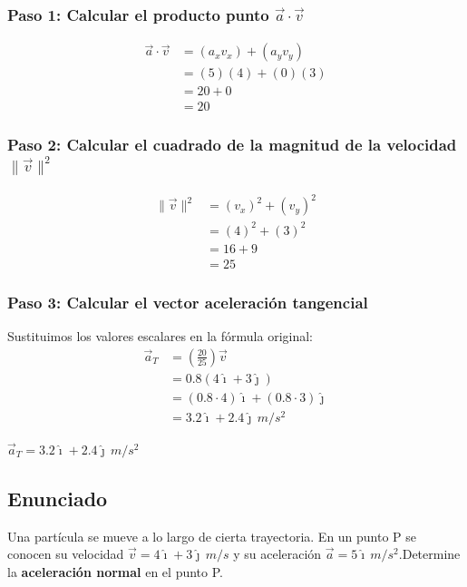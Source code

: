 \documentclass[12pt, a4paper]{article}
\begin{document}
\subsubsection*{Paso 1: Calcular el producto punto $\vec{a} \cdot \vec{v}$}
\begin{align*}
\vec{a} \cdot \vec{v} &= (a_x v_x) + (a_y v_y) \\
&= (5)(4) + (0)(3) \\
&= 20 + 0 \\
&= 20
\end{align*}

\subsubsection*{Paso 2: Calcular el cuadrado de la magnitud de la velocidad $\|\vec{v}\|^2$}
\begin{align*}
\|\vec{v}\|^2 &= (v_x)^2 + (v_y)^2 \\
&= (4)^2 + (3)^2 \\
&= 16 + 9 \\
&= 25
\end{align*}

\subsubsection*{Paso 3: Calcular el vector aceleración tangencial}
Sustituimos los valores escalares en la fórmula original:
\begin{align*}
\vec{a}_T &= \left( \frac{20}{25} \right) \vec{v} \\
&= 0.8 (4\hat{\imath} + 3\hat{\jmath}) \\
&= (0.8 \cdot 4)\hat{\imath} + (0.8 \cdot 3)\hat{\jmath} \\
&= 3.2\hat{\imath} + 2.4\hat{\jmath} \, \si{m/s^2}
\end{align*}

\begin{tcolorbox}[colback=blue!5!white, colframe=blue!75!black, title=Respuesta Final]
\centering
\Large $\vec{a}_T = 3.2\hat{\imath} + 2.4\hat{\jmath} \, \si{m/s^2}$
\end{tcolorbox}


\newpage

\subsection*{Enunciado}
Una partícula se mueve a lo largo de cierta trayectoria. En un punto P se conocen su velocidad $\vec{v} = 4\hat{\imath} + 3\hat{\jmath} \, \si{m/s}$ y su aceleración $\vec{a} = 5\hat{\imath} \, \si{m/s^2}$.Determine la \textbf{aceleración normal} en el punto P.
\end{document}
